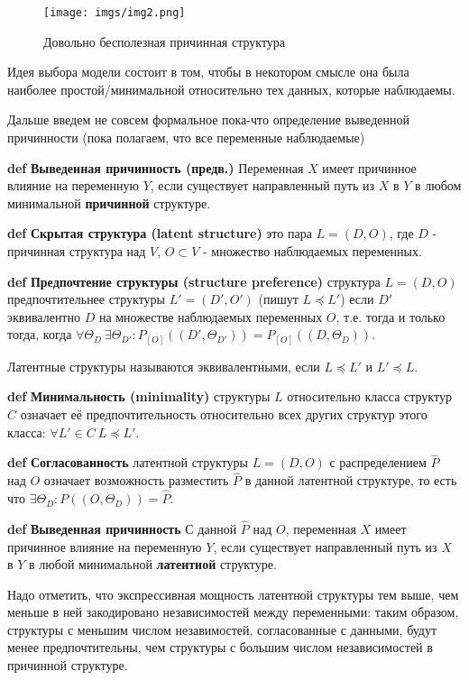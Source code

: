 \documentclass[fleqn]{article}
\def\define#1{\textbf{def} \textbf{#1}}
\begin{document}
\begin{figure}[h]
	\begin{center}
		\texttt{[image: imgs/img2.png]}
	\end{center}
	\caption{Довольно бесполезная причинная структура}
	\label{fig:useless_model}
\end{figure}

Идея выбора модели состоит в том, чтобы в некотором смысле она была наиболее простой/минимальной относительно тех данных, которые наблюдаемы.

Дальше введем не совсем формальное пока-что определение выведенной причинности (пока полагаем, что все переменные наблюдаемые)

\define{Выведенная причинность (предв.)} Переменная $X$ имеет причинное влияние на переменную $Y$, если существует направленный путь из $X$ в $Y$ в любом минимальной \textbf{причинной} структуре.

\define{Скрытая структура (latent structure)} это пара $L = (D, O)$, где $D$ - причинная структура над $V$, $O \subset V$ - множество наблюдаемых переменных.

\define{Предпочтение структуры (structure preference)} структура $L = (D, O)$ предпочтительнее структуры $L' = (D', O')$ (пишут $L \preceq L'$) если $D'$ эквивалентно $D$ на множестве наблюдаемых переменных $O$, т.е. тогда и только тогда, когда  $\forall \Theta_D \  \exists \Theta_{D'} : P_{[O]}((D', \Theta_{D'})) = P_{[O]}((D, \Theta_{D}))$. 

Латентные структуры называются эквивалентными, если $L \preceq L'$ и $L' \preceq L$. 

\define{Минимальность (minimality)} структуры $L$ относительно класса структур $C$ означает её предпочтительность относительно всех других структур этого класса: $\forall L' \in C \ L \preceq L'$.

\define{Согласованность} латентной структуры $L = (D, O)$ с распределением $\hat P$ над $O$ означает возможность разместить $\hat P$ в данной латентной структуре, то есть что $\exists \Theta_D : P((O, \Theta_D)) = \hat P$.


\define{Выведенная причинность} С данной $\hat P$ над $O$, переменная $X$ имеет причинное влияние на переменную $Y$, если существует направленный путь из $X$ в $Y$ в любой минимальной \textbf{латентной} структуре.

Надо отметить, что экспрессивная мощность латентной структуры тем выше, чем меньше в ней закодировано независимостей между переменными: таким образом, структуры с меньшим числом незавимостей, согласованные с данными, будут менее предпочтительны, чем структуры с большим числом независимостей в причинной структуре.
\end{document}
